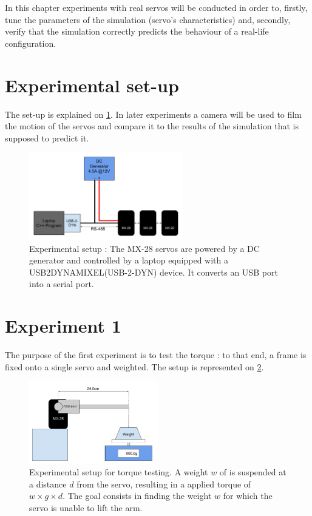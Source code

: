 In this chapter experiments with real servos will be conducted in order to, firstly, tune the parameters of the simulation (servo's characteristics) and, secondly, verify that the simulation correctly predicts the behaviour of a real-life configuration.

\section{Experimental set-up}
The set-up is explained on \cref{fig:exp_setup}. In later experiments a camera will be used to film the motion of the servos and compare it to the results of the simulation that is supposed to predict it.

\begin{figure}[htp]
\center
\includegraphics[width=0.6\textwidth]{figures/exp_setup}
\caption[Experimental setup]{Experimental setup : The MX-28 servos are powered by a DC generator and controlled by a laptop equipped with a USB2DYNAMIXEL(USB-2-DYN) device. It converts an USB port into a serial port.}
\label{fig:exp_setup}
\end{figure}

\section{Experiment 1}
The purpose of the first experiment is to test the torque : to that end, a frame is fixed onto a single servo and weighted. The setup is represented on \cref{fig:exp1}.

\begin{figure}[htp]
\center
    \includegraphics[width = 0.5\textwidth]{figures/exp1}
    \caption[Experimental setup for torque testing]{Experimental setup for torque testing. A weight $w$ of is suspended at a distance $d$ from the servo, resulting in a applied torque of $w \times g \times d$. The goal consists in finding the weight $w$ for which the servo is unable to lift the arm.}
    \label{fig:exp1}
\end{figure}

